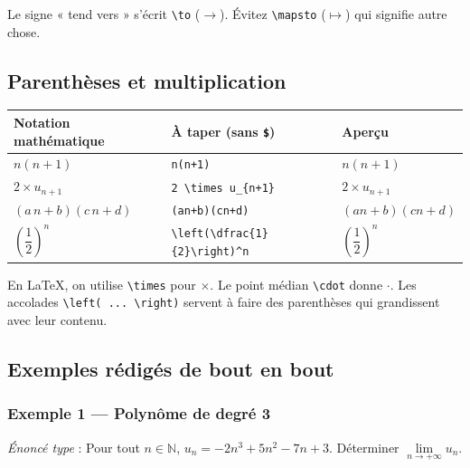 \documentclass[11pt,a4paper]{article}
\begin{document}
\begin{attention}
Le signe « tend vers » s'écrit \verb|\to| (\(\to\)). Évitez \verb|\mapsto|
(\(\mapsto\)) qui signifie autre chose.
\end{attention}

\subsection{Parenthèses et multiplication}

\begin{center}
\renewcommand{\arraystretch}{1.35}
\footnotesize
\begin{tabular}{@{}p{4.6cm}p{6.6cm}p{3.8cm}@{}}
\toprule
\textbf{Notation mathématique} & \textbf{À taper (sans \texttt{\$})} & \textbf{Aperçu} \\
\midrule
\(n(n+1)\)            & \verb|n(n+1)|                & \(n(n+1)\) \\
\(2 \times u_{n+1}\)  & \verb|2 \times u_{n+1}|      & \(2 \times u_{n+1}\) \\
\((a\,n+b)(c\,n+d)\)  & \verb|(an+b)(cn+d)|          & \((an+b)(cn+d)\) \\
\(\left(\dfrac{1}{2}\right)^n\) &
\verb|\left(\dfrac{1}{2}\right)^n| & \(\left(\dfrac{1}{2}\right)^n\) \\
\bottomrule
\end{tabular}
\end{center}

\begin{astuce}
En \LaTeX, on utilise \verb|\times| pour \(\times\). Le point médian
\verb|\cdot| donne \(\cdot\). Les accolades \verb|\left( ... \right)| servent
à faire des parenthèses qui grandissent avec leur contenu.
\end{astuce}

\subsection{Exemples rédigés de bout en bout}

\subsubsection*{Exemple 1 — Polynôme de degré 3}

\emph{Énoncé type} : \og Pour tout \(n \in \mathbb{N}\), \(u_n = -2n^3 + 5n^2 - 7n + 3\).
Déterminer \(\lim\limits_{n \to +\infty} u_n\). \fg
\end{document}
